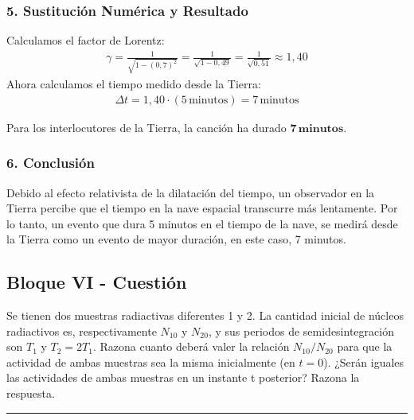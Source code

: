 \subsubsection*{5. Sustitución Numérica y Resultado}
Calculamos el factor de Lorentz:
\begin{gather}
    \gamma = \frac{1}{\sqrt{1 - (0,7)^2}} = \frac{1}{\sqrt{1 - 0,49}} = \frac{1}{\sqrt{0,51}} \approx 1,40
\end{gather}
Ahora calculamos el tiempo medido desde la Tierra:
\begin{gather}
    \Delta t = 1,40 \cdot (5\,\text{minutos}) = 7\,\text{minutos}
\end{gather}
\begin{cajaresultado}
Para los interlocutores de la Tierra, la canción ha durado $\boldsymbol{7\,\textbf{minutos}}$.
\end{cajaresultado}

\subsubsection*{6. Conclusión}
\begin{cajaconclusion}
Debido al efecto relativista de la dilatación del tiempo, un observador en la Tierra percibe que el tiempo en la nave espacial transcurre más lentamente. Por lo tanto, un evento que dura 5 minutos en el tiempo de la nave, se medirá desde la Tierra como un evento de mayor duración, en este caso, 7 minutos.
\end{cajaconclusion}

\newpage

\subsection{Bloque VI - Cuestión}
\label{subsec:B6_2014_jul_ext}

\begin{cajaenunciado}
Se tienen dos muestras radiactivas diferentes 1 y 2. La cantidad inicial de núcleos radiactivos es, respectivamente $N_{10}$ y $N_{20}$, y sus periodos de semidesintegración son $T_{1}$ y $T_{2}=2T_{1}$. Razona cuanto deberá valer la relación $N_{10}/N_{20}$ para que la actividad de ambas muestras sea la misma inicialmente (en $t=0$). ¿Serán iguales las actividades de ambas muestras en un instante t posterior? Razona la respuesta. 
\end{cajaenunciado}
\hrule

